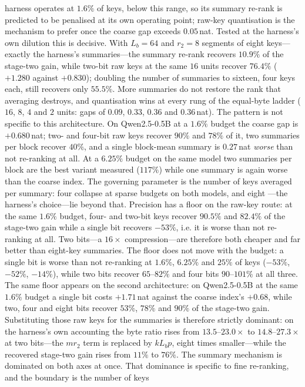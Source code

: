 \documentclass[sigconf,nonacm,11pt]{acmart}
\begin{document}
harness operates at $1.6\%$ of keys, below this range, so its summary re-rank is
predicted to be penalised at its own operating point; raw-key quantisation is the
mechanism to prefer once the coarse gap exceeds $0.05$\,nat. Tested at the harness's own dilution this is decisive. With $L_b=64$ and $r_2=8$
segments of eight keys---exactly the harness's summaries---the summary re-rank
recovers $10.9\%$ of the stage-two gain, while two-bit raw keys at the same $16$
units recover $76.4\%$ ($+1.280$ against $+0.830$); doubling the number of summaries
to sixteen, four keys each, still recovers only $55.5\%$. More summaries do not
restore the rank that averaging destroys, and quantisation wins at every rung of the
equal-byte ladder ($16$, $8$, $4$ and $2$ units: gaps of $0.09$, $0.33$, $0.36$ and
$0.36$\,nat). The pattern is not specific to this architecture. On Qwen2.5-0.5B at a $1.6\%$
budget the coarse gap is $+0.680$\,nat; two- and four-bit raw keys recover $90\%$ and
$78\%$ of it, two summaries per block recover $40\%$, and a single block-mean summary
is $0.27$\,nat \emph{worse} than not re-ranking at all. At a $6.25\%$ budget on the
same model two summaries per block are the best variant measured ($117\%$) while one
summary is again worse than the coarse index. The governing parameter is the number of
keys averaged per summary: four collapse at sparse budgets on both models, and eight
---the harness's choice---lie beyond that. Precision has a floor on the raw-key route: at the same $1.6\%$ budget, four- and
two-bit keys recover $90.5\%$ and $82.4\%$ of the stage-two gain while a single bit
recovers $-53\%$, i.e. it is worse than not re-ranking at all. Two bits---a $16\times$
compression---are therefore both cheaper and far better than eight-key summaries. The floor does not move with the budget: a single bit is worse than not re-ranking at
$1.6\%$, $6.25\%$ and $25\%$ of keys ($-53\%$, $-52\%$, $-14\%$), while two bits
recover $65$--$82\%$ and four bits $90$--$101\%$ at all three. The same floor appears on the second architecture: on Qwen2.5-0.5B at the same $1.6\%$
budget a single bit costs $+1.71$\,nat against the coarse index's $+0.68$, while two,
four and eight bits recover $53\%$, $78\%$ and $90\%$ of the stage-two gain. Substituting those raw keys for the summaries is therefore strictly dominant: on the
harness's own accounting the byte ratio rises from $13.5$--$23.0\times$ to
$14.8$--$27.3\times$ at two bits---the $m r_2$ term is replaced by $k L_b p$, eight
times smaller---while the recovered stage-two gain rises from $11\%$ to $76\%$. The
summary mechanism is dominated on both axes at once. That dominance is specific to fine re-ranking, and the boundary is the number of keys
\end{document}
